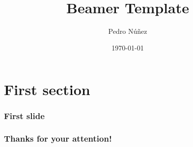 \documentclass[12pt]{beamer}
\title[Beamer Template]{Beamer Template}
\author{Pedro N\'{u}\~{n}ez}
\institute{Albert-Ludwigs-Universit\"{a}t Freiburg}
\date{\today}
\begin{document}
\frame{\titlepage}

\section{First section}
\begin{frame}
    \frametitle{First slide}
\end{frame}

\begin{frame}
    \frametitle{Thanks for your attention!}
    \printbibliography
\end{frame}
\end{document}
